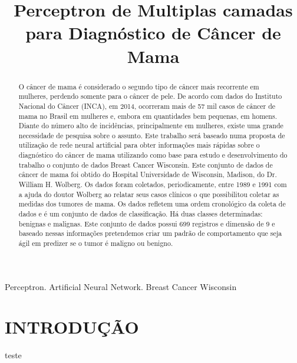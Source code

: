 \documentclass[conference]{IEEEtran}
\begin{document}
\title{Perceptron de Multiplas camadas para Diagnóstico de Câncer de Mama}

\author{
    \and
    \and
}
\maketitle

\begin{abstract}
O câncer de mama é considerado o segundo tipo de câncer mais recorrente em mulheres, perdendo somente para o câncer de pele. De acordo com dados do Instituto Nacional do Câncer (INCA), em 2014, ocorreram mais de 57 mil casos de câncer de mama no Brasil em mulheres e, embora em quantidades bem pequenas, em homens. Diante do número alto de incidências, principalmente em mulheres, existe uma grande necessidade de pesquisa sobre o assunto. Este trabalho será baseado numa proposta de utilização de rede neural artificial para obter informações mais rápidas sobre o diagnóstico do câncer de mama utilizando como base para estudo e desenvolvimento do trabalho o conjunto de dados Breast Cancer Wisconsin. Este conjunto de dados de câncer de mama foi obtido do Hospital Universidade de Wisconsin, Madison, do Dr. William H. Wolberg. Os dados foram coletados, periodicamente, entre 1989 e 1991 com a ajuda do doutor Wolberg ao relatar seus casos clínicos o que possibilitou coletar as medidas dos tumores de mama. Os dados refletem uma ordem cronológico da coleta de dados e é um conjunto de dados de classificação. Há duas classes determinadas: benignas e malignas. Este conjunto de dados possui 699 registros e dimensão de 9 e baseado nessas informações pretendemos criar um padrão de comportamento que seja ágil em predizer se o tumor é maligno ou benigno.

\end{abstract}

\begin{IEEEkeywords}
Perceptron. Artificial Neural Network. Breast Cancer Wisconsin
\end{IEEEkeywords}

\section{INTRODUÇÃO}
teste
\end{document}
